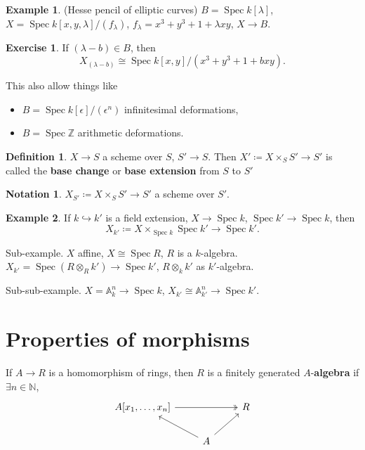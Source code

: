 \documentclass[12pt]{article}
\DeclareMathOperator{\Spec}{Spec}
\theoremstyle{definition}
\newtheorem*{definition}{Definition}
\newtheorem*{notation}{Notation}
\newtheorem*{exercise}{Exercise}
\newtheorem*{example}{Example}
\begin{document}
\begin{example}
(Hesse pencil of elliptic curves) $B=\Spec k[\lambda]$, $X=\Spec k[x,y,\lambda]/(f_\lambda)$, $f_\lambda=x^3+y^3+1+\lambda xy$, $X\rightarrow B$.

\begin{exercise}
If $(\lambda-b)\in B$, then
\[X_{(\lambda-b)}\cong\Spec k[x,y]/(x^3+y^3+1+bxy).\]
\end{exercise}

This also allow things like
\begin{itemize}
\item $B=\Spec k[\epsilon]/(\epsilon^n)$ infinitesimal deformations,
\item $B=\Spec\mathbb Z$ arithmetic deformations.
\end{itemize}
\end{example}

\begin{definition}
$X\rightarrow S$ a scheme over $S$, $S'\rightarrow S$. Then $X'\coloneqq X\times_SS'\rightarrow S'$ is called the \textbf{base change} or \textbf{base extension} from $S$ to $S'$
\end{definition}

\begin{notation}
$X_{S'}\coloneqq X\times_SS'\rightarrow S'$ a scheme over $S'$.
\end{notation}

\begin{example}
If $k\hookrightarrow k'$ is a field extension, $X\rightarrow\Spec k$, $\Spec k'\rightarrow\Spec k$, then
\[X_{k'}\coloneqq X\times_{\Spec k}\Spec k'\longrightarrow\Spec k'.\]

Sub-example. $X$ affine, $X\cong\Spec R$, $R$ is a $k$-algebra. $X_{k'}=\Spec(R\otimes_Rk')\rightarrow\Spec k'$, $R\otimes_kk'$ as $k'$-algebra.

Sub-sub-example. $X=\mathbb A_k^n\rightarrow\Spec k$, $X_{k'}\cong\mathbb A_{k'}^n\rightarrow\Spec k'$.
\end{example}

\section{Properties of morphisms}
If $A\rightarrow R$ is a homomorphism of rings, then $R$ is a finitely generated $A$-\textbf{algebra} if $\exists n\in\mathbb N$,
\[\begin{tikzcd}A[x_1,\ldots,x_n]\arrow[rr,two heads]&&R\\&A\arrow[lu]\arrow[ru]\end{tikzcd}\]
\end{document}
